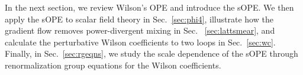 In the next section, we review Wilson's OPE and introduce the sOPE. We then 
apply the sOPE to scalar field theory in Sec.~\ref{sec:phi4}, illustrate how 
the gradient flow removes power-divergent mixing in Sec.~
\ref{sec:lattsmear}, 
and calculate 
the perturbative Wilson coefficients to two loops in Sec.~\ref{sec:wc}. 
Finally, in Sec.~\ref{sec:rgeqns}, we study the scale dependence of the sOPE 
through renormalization group 
equations for the Wilson coefficients.

